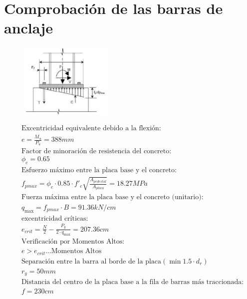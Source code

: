 \documentclass[12pt]{article}
\begin{document}
    \section{Comprobación de las barras de anclaje}
    \begin{minipage}{\textwidth}

        \begin{figure}
            \includegraphics[width=0.4\textwidth]{esquema_momentos.png}
        \end{figure}
        
        \begin{align*}
            &\text{Excentricidad equivalente debido a la flexión:} \\
            &e = \frac{M_u}{P_u} = 388 mm \\
            &\text{Factor de minoración de resistencia del concreto:} \\
            &\phi_{c} = 0.65\\
            &\text{Esfuerzo máximo entre la placa base y el concreto:} \\
            &f_{pmax} = \phi_c \cdot 0.85 \cdot f'_c \sqrt{\frac{A_{pedestal}}{A_{placa}}} = 18.27 MPa \\
            &\text{Fuerza máxima entre la placa base y el concreto (unitario):}\\
            &q_{\max} = f_{pmax} \cdot B = 91.36 kN/cm\\
            &\text{excentricidad críticas:}\\
            &e_{crit} = \frac{N}{2}-\frac{P_y}{2 \cdot q_{\max}} = 207.36 cm \\
            &\text{Verificación por Momentos Altos:}\\
            &e>e_{crit} \text{\ldots Momentos Altos}\\
            &\text{Separación entre la barra al borde de la placa} (\min 1.5\cdot d_r)\\
            &r_y = 50 mm \\
            &\text{Distancia del centro de la placa base a la fila de barras más traccionada:}\\
            &f = 230 cm \\
        \end{align*}
    \end{minipage}
\end{document}
